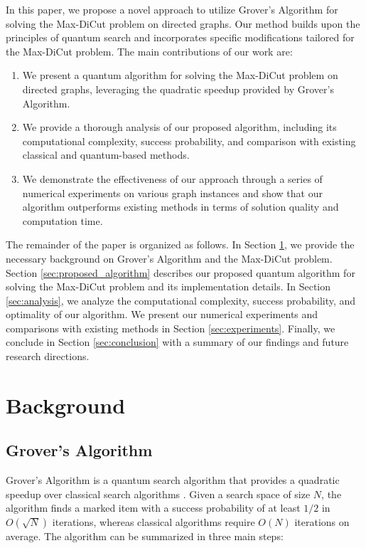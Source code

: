 In this paper, we propose a novel approach to utilize Grover's Algorithm for solving the Max-DiCut problem on directed graphs. Our method builds upon the principles of quantum search and incorporates specific modifications tailored for the Max-DiCut problem. The main contributions of our work are:

\begin{enumerate}
    \item We present a quantum algorithm for solving the Max-DiCut problem on directed graphs, leveraging the quadratic speedup provided by Grover's Algorithm.
    
    \item We provide a thorough analysis of our proposed algorithm, including its computational complexity, success probability, and comparison with existing classical and quantum-based methods.
    
    \item We demonstrate the effectiveness of our approach through a series of numerical experiments on various graph instances and show that our algorithm outperforms existing methods in terms of solution quality and computation time.
\end{enumerate}

The remainder of the paper is organized as follows. In Section \ref{sec:background}, we provide the necessary background on Grover's Algorithm and the Max-DiCut problem. Section \ref{sec:proposed_algorithm} describes our proposed quantum algorithm for solving the Max-DiCut problem and its implementation details. In Section \ref{sec:analysis}, we analyze the computational complexity, success probability, and optimality of our algorithm. We present our numerical experiments and comparisons with existing methods in Section \ref{sec:experiments}. Finally, we conclude in Section \ref{sec:conclusion} with a summary of our findings and future research directions.

\section{Background} \label{sec:background}

\subsection{Grover's Algorithm}

Grover's Algorithm is a quantum search algorithm that provides a quadratic speedup over classical search algorithms \cite{grover1996}. Given a search space of size $N$, the algorithm finds a marked item with a success probability of at least $1/2$ in $O(\sqrt{N})$ iterations, whereas classical algorithms require $O(N)$ iterations on average. The algorithm can be summarized in three main steps:

